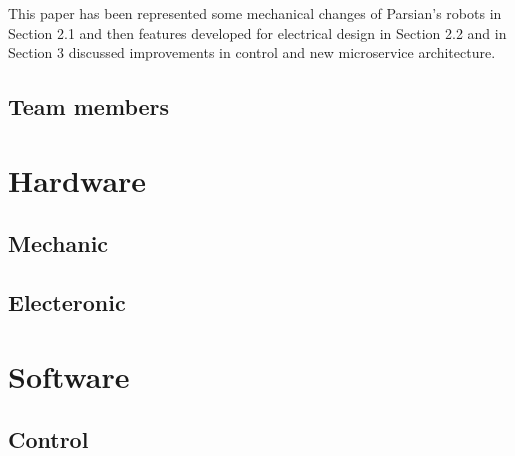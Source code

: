\documentclass{llncs}
\begin{document}
This paper has been represented some mechanical changes of Parsian’s robots in Section 2.1 and then features developed for electrical design in Section 2.2 and in Section 3 discussed improvements in control and new microservice architecture.
%

\newpage

\subsection{Team members} %
%

%
\section {Hardware}
%
\subsection{Mechanic}
\subsection{Electeronic}
%

\section{Software}
%
\subsection{Control}
\end{document}

